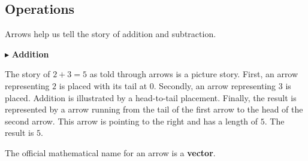 \documentclass{ximera}
\begin{document}
\subsection*{Operations} 


Arrows help us tell the story of addition and subtraction.



$\blacktriangleright$ \textbf{Addition}


The story of $2+3=5$ as told through arrows is a picture story.  First, an arrow representing $2$ is placed with its tail at $0$.  Secondly, an arrow representing $3$ is placed.  Addition is illustrated by a head-to-tail placement.  Finally, the result is represented by a arrow running from the tail of the first arrow to the head of the second arrow. This arrow is pointing to the right and has a length of $5$.  The result is $5$.




  \begin{image}
  \end{image}





The official mathematical name for an arrow is a \textbf{\textcolor{purple!85!blue}{vector}}.
\end{document}

